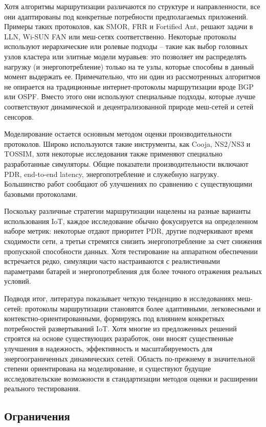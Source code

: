 \documentclass[%
]{report}
\begin{document}
Хотя алгоритмы маршрутизации различаются по
структуре и направленности, все они адаптированы
под конкретные потребности предполагаемых приложений.
Примеры таких протоколов, как SMOR, FRR и Fortified Ant,
решают задачи в LLN, Wi-SUN FAN или меш-сетях
соответственно. Некоторые протоколы используют
иерархические или ролевые подходы --
такие как выбор головных узлов кластера или
элитные модели муравьев: это позволяет им
распределять нагрузку (и энергопотребление)
только на те узлы, которые способны в данный момент
выдержать ее.
Примечательно, что ни один из рассмотренных алгоритмов
не опирается на традиционные интернет-протоколы маршрутизации
вроде BGP или OSPF. Вместо этого они
используют специальные подходы, которые лучше соответствуют
динамической и децентрализованной природе меш-сетей
и сетей сенсоров.

Моделирование остается основным методом оценки
производительности протоколов. Широко используются такие
инструменты, как Cooja, NS2/NS3 и TOSSIM,
хотя некоторые исследования также применяют
специально разработанные симуляторы. Общие показатели
производительности включают PDR, end-to-end latency,
энергопотребление и служебную нагрузку.
Большинство работ сообщают об улучшениях по сравнению
с существующими базовыми протоколами.

Поскольку различные стратегии маршрутизации
нацелены на разные варианты использования IoT,
каждое исследование обычно фокусируется
на определенном наборе метрик: некоторые
отдают приоритет PDR, другие подчеркивают
время сходимости сети, а третьи
стремятся снизить энергопотребление за
счет снижения пропускной способности данных.
Хотя тестирование на аппаратном
обеспечении встречается редко, симуляции
часто настраиваются с реалистичными параметрами
батарей и энергопотребления для более точного
отражения реальных условий.

Подводя итог, литература показывает четкую
тенденцию в исследованиях меш-сетей:
протоколы маршрутизации становятся более адаптивными,
легковесными и контекстно-ориентированными,
формируясь под влиянием конкретных
потребностей развертываний IoT. Хотя многие
из предложенных решений строятся на
основе существующих разработок,
они вносят существенные улучшения в надежность,
эффективность и масштабируемость для энергоограниченных
динамических сетей. Область по-прежнему в
значительной степени ориентирована на моделирование,
и существуют будущие исследовательские возможности
в стандартизации методов оценки и расширении реального
тестирования.

\subsection{Ограничения}\label{limitations}
\end{document}
